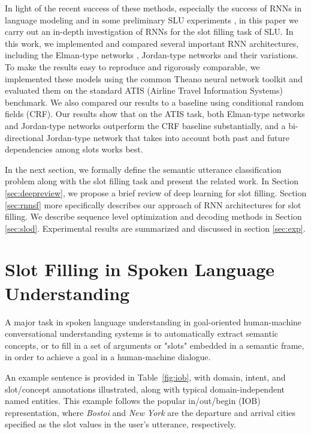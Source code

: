 In light of the recent success of these methods, especially the success of RNNs
in language modeling \citep{rnn22, rnn23} and in some preliminary SLU experiments
\citep{rnn15,rnn24,rnn30,rnn56}, in this paper we carry out an in-depth investigation of RNNs for
the slot filling task of SLU. In this work, we implemented and compared several
important RNN architectures, including the Elman-type networks \citep{rnn16},
Jordan-type networks \citep{rnn17} and their variations. To make the results easy to
reproduce and rigorously comparable, we implemented these models using the
common Theano neural network toolkit \citep{rnn25} and evaluated them on the standard
ATIS (Airline Travel Information Systems) benchmark. We also compared our
results to a baseline using conditional random fields (CRF). Our results show
that on the ATIS task, both Elman-type networks and Jordan-type networks
outperform the CRF baseline substantially, and a bi-directional Jordan-type
network that takes into account both past and future dependencies among slots
works best.

In the next section, we formally define the semantic utterance
classification problem along with the slot filling task and present the
related work. In Section \ref{sec:deepreview}, we propose a brief review of deep learning
for slot filling. Section \ref{sec:rnnsf} more specifically describes our approach of
RNN architectures for slot filling. We describe sequence level
optimization and decoding methods in Section \ref{sec:slod}. Experimental results
are summarized and discussed in section \ref{sec:exp}.

\section{Slot Filling in Spoken Language Understanding}
\label{sec:sfslu}

A major task in spoken language understanding in goal-oriented human-machine
conversational understanding systems is to automatically extract semantic
concepts, or to fill in a set of arguments or "slots" embedded in a semantic
frame, in order to achieve a goal in a human-machine dialogue. 

An example sentence is provided in Table~\ref{fig:iob}, with domain, intent, and slot/concept
annotations illustrated, along with typical domain-independent named entities.
This example follows the popular in/out/begin (IOB) representation, where {\it
Bostoi} and {\it New York} are the departure and arrival cities specified as
the slot values in the user's utterance, respectively.

